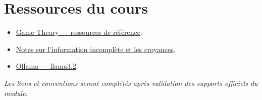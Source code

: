 \documentclass[11pt,a4paper]{article}
\begin{document}
\section{Ressources du cours}
\begin{itemize}
  \item \href{https://www.gametheory.net/}{Game Theory — ressources de référence}.
  \item \href{https://www.cs.cmu.edu/~epxing/Class/10708-19/notes/lecture-07.pdf}
        {Notes sur l'information incomplète et les croyances}.
  \item \href{https://ollama.com/library/llama3.2}{Ollama — llama3.2}.
\end{itemize}
\textit{Les liens et conventions seront complétés après validation des supports
officiels du module.}
\end{document}

